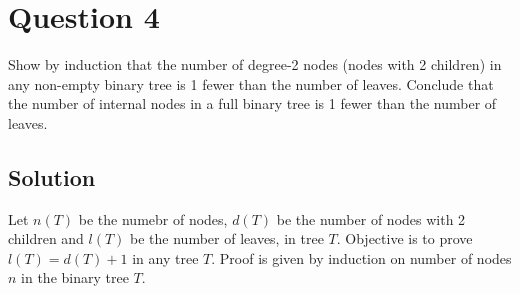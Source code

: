 
\section*{Question 4}

Show by induction that the number of degree-2 nodes (nodes with 2 children) in any non-empty binary tree is 1 fewer than the number of leaves. Conclude that the number of internal nodes in a full binary tree is 1 fewer than the number of leaves.

\subsection*{Solution}

Let $n(T)$ be the numebr of nodes, $d(T)$ be the number of nodes with 2 children and $l(T)$ be the number of leaves, in tree $T$. Objective is to prove $l(T) = d(T) + 1$ in any tree $T$.
Proof is given by induction on number of nodes $n$ in the binary tree $T$.


